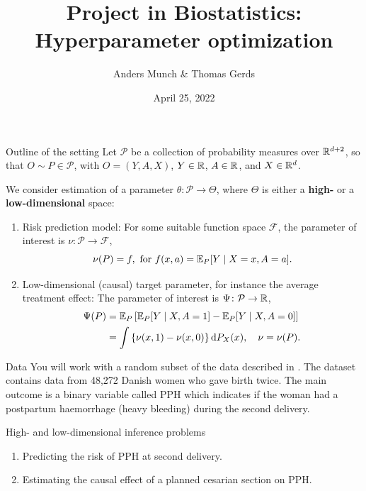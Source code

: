 \documentclass[smaller]{beamer}\usepackage{listings}
\author{Anders Munch \& Thomas Gerds}
\date{April 25, 2022}
\title{Project in Biostatistics: Hyperparameter optimization}
\begin{document}
\maketitle
\begin{frame}[label={sec:org7c5ab8f}]{Outline of the setting}
Let $\mathcal{P}$ be a collection of probability measures over $\mathbb{R}^{d+2}$, so that
$O \sim P \in \mathcal{P}$, with $O = (Y, A, X)$, $Y\in \mathbb{R}$, $A\in \mathbb{R}$, and $X \in \mathbb{R}^d$.

\vfill

We consider estimation of a parameter $\theta \colon \mathcal{P} \rightarrow \Theta$, where $\Theta$
is either a \textbf{high-} or a \textbf{low-dimensional} space:

\vfill

\begin{enumerate}
\item Risk prediction model: For some suitable function space \(\mathcal{F}\), the parameter of interest
is \(\nu \colon \mathcal{P} \rightarrow \mathcal{F}\), \[\nu(P) = f, \text{ for } f(x, a) = \operatorname{\mathbb{E}}_P[Y
   \mid X=x, A=a]. \]
\item Low-dimensional (causal) target parameter, for instance the average treatment effect: The
parameter of interest is \(\Psi \colon \mathcal{P} \rightarrow \mathbb{R}\),
\begin{align*}
  \Psi(P)
  & = \operatorname{\mathbb{E}}_P{\left[ \operatorname{\mathbb{E}}_P[Y \mid X, A=1] - \operatorname{\mathbb{E}}_P[Y \mid X, A=0] \right]} \\
  & = \int {\left\{ \nu(x, 1) - \nu(x, 0) \right\}} \mathop{}\!\mathrm{d} P_X(x),
    \quad \nu = \nu(P).
\end{align*}
\end{enumerate}
\end{frame}

\begin{frame}[label={sec:org6f1cc6c}]{Data}
You will work with a random subset of the data described in \cite{wikkelso2014prediction}. The
dataset contains data from 48,272 Danish women who gave birth twice. The main outcome is a binary
variable called PPH which indicates if the woman had a postpartum haemorrhage (heavy bleeding)
during the second delivery.

\vfill

\begin{block}{High- and low-dimensional inference problems}
\begin{enumerate}
\item Predicting the risk of PPH at second delivery.
\item Estimating the causal effect of a planned cesarian section on PPH.
\end{enumerate}
\end{block}
\end{frame}
\end{document}
